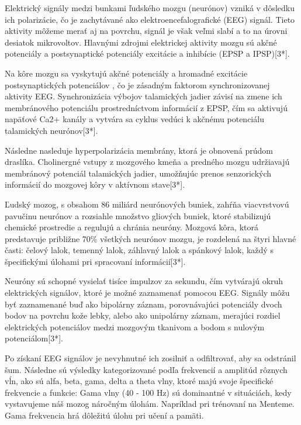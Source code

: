 \tab[5 mm] Elektrický signály medzi bunkami ľudského mozgu (neurónov) vzniká v dôsledku ich polarizácie, čo je zachytávané ako elektroencefalografické (EEG) signál. Tieto aktivity môžeme merať aj na povrchu, signál je však veľmi slabí a to na úrovni desiatok mikrovoltov. Hlavnými zdrojmi elektrickej aktivity mozgu sú akčné potenciály a postsynaptické potenciály excitácie a inhibície (EPSP a IPSP)[3*].

\tab[5 mm] Na kôre mozgu sa vyskytujú akčné potenciály a hromadné excitácie postsynaptických potenciálov , čo je zásadným faktorom synchronizovanej aktivity EEG. Synchronizácia výbojov talamických jadier závisí na zmene ich membránového potenciálu prostredníctvom informácií z EPSP, čím sa aktivujú napäťové Ca2+ kanály a vytvára sa cyklus vedúci k akčnému potenciálu talamických neurónov[3*].

\tab[5 mm] Následne nasleduje hyperpolarizácia membrány, ktorá je obnovená prúdom draslíka. Cholinergné vstupy z mozgového kmeňa a predného mozgu udržiavajú membránový potenciál talamických jadier, umožňujúc prenos senzorických informácií do mozgovej kôry v aktívnom stave[3*].

\tab[5 mm] Ľudský mozog, s obsahom 86 miliárd neurónových buniek, zahŕňa viacvrstvovú pavučinu neurónov a rozsiahle množstvo gliových buniek, ktoré stabilizujú chemické prostredie a regulujú a chránia neuróny. Mozgová kôra, ktorá predstavuje približne 70\% všetkých neurónov mozgu, je rozdelená na štyri hlavné časti: čelový lalok, temenný lalok, záhlavný lalok a spánkový lalok, každý s špecifickými úlohami pri spracovaní informácií[3*].

\tab[5 mm] Neuróny sú schopné vysielať tisíce impulzov za sekundu, čím vytvárajú okruh elektrických signálov, ktoré je možné zaznamenať pomocou EEG. Signály môžu byť zaznamenané buď ako bipolárny záznam, porovnávajúci potenciály dvoch bodov na povrchu kože lebky, alebo ako unipolárny záznam, merajúci rozdiel elektrických potenciálov medzi mozgovým tkanivom a bodom s nulovým potenciálom[3*].

\tab[5 mm] Po získaní EEG signálov je nevyhnutné ich zosilniť a odfiltrovať, aby sa odstránil šum. Následne sú výsledky kategorizované podľa frekvencií a amplitúd rôznych vĺn, ako sú alfa, beta, gama, delta a theta vlny, ktoré majú svoje špecifické frekvencie  a funkcie:
\tab[5 mm] Gama vlny (40 - 100 Hz) sú dominantné v situáciách, kedy vystavujeme náš mozog náročným úlohám. Napríklad pri trénovaní na Menteme. Gama frekvencia hrá dôležitú úlohu pri učení a pamäti.

